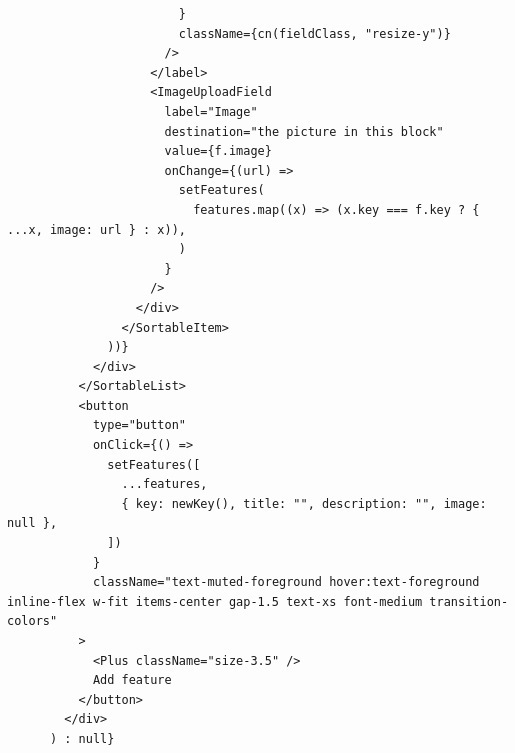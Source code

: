 \documentclass[11pt,a4paper]{article}
\begin{document}
\begin{lstlisting}
                        }
                        className={cn(fieldClass, "resize-y")}
                      />
                    </label>
                    <ImageUploadField
                      label="Image"
                      destination="the picture in this block"
                      value={f.image}
                      onChange={(url) =>
                        setFeatures(
                          features.map((x) => (x.key === f.key ? { ...x, image: url } : x)),
                        )
                      }
                    />
                  </div>
                </SortableItem>
              ))}
            </div>
          </SortableList>
          <button
            type="button"
            onClick={() =>
              setFeatures([
                ...features,
                { key: newKey(), title: "", description: "", image: null },
              ])
            }
            className="text-muted-foreground hover:text-foreground inline-flex w-fit items-center gap-1.5 text-xs font-medium transition-colors"
          >
            <Plus className="size-3.5" />
            Add feature
          </button>
        </div>
      ) : null}


\end{lstlisting}
\end{document}
